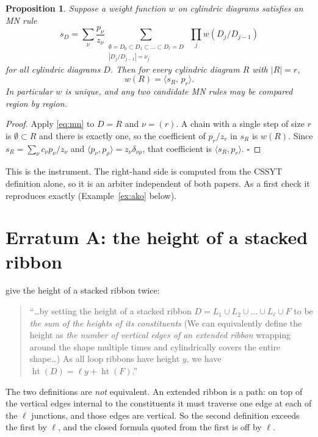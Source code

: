 \documentclass[11pt]{article}
\theoremstyle{plain}
\newtheorem{proposition}[theorem]{Proposition}
\theoremstyle{definition}
\theoremstyle{remark}
\DeclareMathOperator{\hgt}{ht}
\begin{document}
\begin{proposition}\label{prop:reduce}
Suppose a weight function $w$ on cylindric diagrams satisfies an MN rule
\begin{equation}\label{eq:mn}
  s_D=\sum_{\nu}\frac{p_\nu}{z_\nu}\sum_{\substack{\emptyset=D_0\subset D_1\subset\dots\subset D_{\ell}=D\\ |D_j/D_{j-1}|=\nu_j}}\ \prod_{j}w(D_j/D_{j-1})
\end{equation}
for all cylindric diagrams $D$. Then for every cylindric diagram $R$ with $|R|=r$,
\[
  w(R)=\langle s_R,\,p_r\rangle .
\]
In particular $w$ is unique, and any two candidate MN rules may be compared region by region.
\end{proposition}

\begin{proof}
Apply \eqref{eq:mn} to $D=R$ and $\nu=(r)$. A chain with a single step of size $r$ is
$\emptyset\subset R$ and there is exactly one, so the coefficient of $p_r/z_r$ in $s_R$ is $w(R)$.
Since $s_R=\sum_\nu c_\nu p_\nu/z_\nu$ and $\langle p_\nu,p_\rho\rangle=z_\nu\delta_{\nu\rho}$, that
coefficient is $\langle s_R,p_r\rangle$. $\square$
\end{proof}

This is the instrument. The right-hand side is computed from the CSSYT definition alone, so it is an
arbiter independent of both papers. As a first check it reproduces \cite[\texttt{ex:mnrule}]{AKO}
exactly (Example~\ref{ex:ako} below).

\section{Erratum A: the height of a stacked ribbon}

\cite[l.\,1182--1187]{AKO} give the height of a stacked ribbon twice:
\begin{quote}
``\dots by setting the height of a stacked ribbon $D=L_1\cup L_2\cup\dots\cup L_\ell\cup F$ to be
\emph{the sum of the heights of its constituents} (We can equivalently define the height as
\emph{the number of vertical edges of an extended ribbon} wrapping around the shape multiple times
and cylindrically covers the entire shape\dots) As all loop ribbons have height $y$, we have
$\hgt(D)=\ell y+\hgt(F)$.''
\end{quote}
The two definitions are \emph{not} equivalent. An extended ribbon is a path: on top of the vertical
edges internal to the constituents it must traverse one edge at each of the $\ell$ junctions, and
those edges are vertical. So the second definition exceeds the first by $\ell$, and the closed
formula quoted from the first is off by $\ell$.
\end{document}
